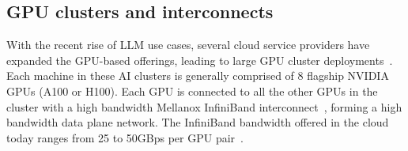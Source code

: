 \subsection{GPU clusters and interconnects}
\label{sec:gpu-interconnect}
With the recent rise of LLM use cases, several cloud service providers have expanded the GPU-based offerings, leading to large GPU cluster deployments~\cite{meta_ai_supercluster,azure_openai,coreweave}.
Each machine in these AI clusters is generally comprised of 8 flagship NVIDIA GPUs (A100 or H100).
Each GPU is connected to all the other GPUs in the cluster with a high bandwidth Mellanox InfiniBand interconnect~\cite{infiniband,azure_ib}, forming a high bandwidth data plane network.
The InfiniBand bandwidth offered in the cloud today ranges from 25 to 50GBps per GPU pair~\cite{azure_ib,coreweave_ib}.
